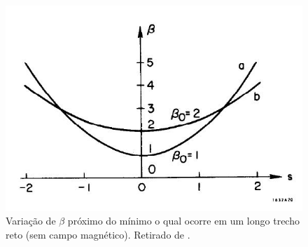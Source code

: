 \begin{figure}[!htb]
	\centering
	\includegraphics[width=0.8\linewidth]{./Figuras/fig20.jpeg}
	\caption{Variação de $\beta$ próximo do mínimo o qual ocorre em um longo trecho reto (sem campo magnético). Retirado de \cite{sands1970physics}.}
	\label{fig:fig20}
\end{figure}
